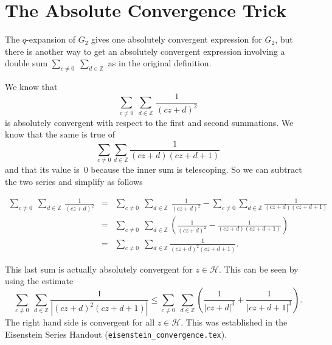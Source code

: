 \documentclass {amsart}
\theoremstyle{plain}
\theoremstyle{definition}
\theoremstyle{remark}
\newcommand{\bZ}{{\mathbb{Z}}}
\newcommand{\h}{{\mathcal{H}}}
\begin{document}

\section {The Absolute Convergence Trick}

The $q$-expansion of $G_2$ gives one absolutely convergent expression for $G_2$,
but there is another way to get an absolutely convergent expression involving 
a double sum $\sum_{c \ne 0} \; \sum_{d \in \bZ}$ as in the original definition.

We know that 
$$\sum_{c \ne 0} \; \sum_{d \in \bZ} \, \frac{1}{(c z + d)^2}$$
is absolutely convergent with respect to the first and second summations.
We know that the same is true of
$$
\sum_{c \ne 0} \sum_{d\in\bZ}  \frac{1}{(c z + d) (c z + d + 1)}
$$
and that its value is~$0$ because the inner sum is telescoping.
So we can subtract the two series and simplify as follows

\begin{eqnarray*}
\sum_{c \ne 0} \; \sum_{d \in \bZ} \, \frac{1}{(c z + d)^2}
&=&
\sum_{c \ne 0} \; \sum_{d \in \bZ} \, \frac{1}{(c z + d)^2} -
    \sum_{c \ne 0} \sum_{d\in\bZ}  \frac{1}{(c z + d) (c z + d + 1)}
\\
&=&
\sum_{c \ne 0} \; \sum_{d \in \bZ} \left( \frac{1}{(c z + d)^2}
-
 \frac{1}{(c z + d) (c z + d + 1)}
\right)
\\
&=&
\sum_{c \ne 0} \; \sum_{d \in \bZ}
 \frac{1}{(c z + d)^2 (c z + d + 1)}.
\end{eqnarray*}

This last sum is actually absolutely convergent for $z \in \h$.
This can be seen by using the estimate
$$
\sum_{c \ne 0} \; \sum_{d \in \bZ}
 \frac{1}{|(c z + d)^2 (c z + d + 1)|}
\le
\sum_{c \ne 0} \; \sum_{d \in \bZ}
\left(
 \frac{1}{|c z + d|^3}
 +
 \frac{1}{|c z + d + 1|^3}
 \right).
$$
The right hand side is convergent for all $z\in\h$. This was established
in the Eisenstein Series Handout (\texttt{eisenstein\_convergence.tex}).
\end{document}
